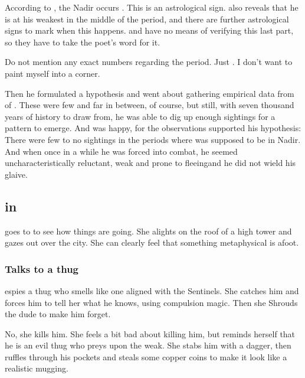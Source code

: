According to \WanderersInDarknessEmph, the Nadir occurs . 
This is an astrological sign. 
\WanderersInDarknessEmph also reveals that he is at his weakest in the middle of the period, and there are further astrological signs to mark when this happens. 
\Teshrial{} and \Lothagiel{} have no means of verifying this last part, so they have to take the poet's word for it. 

Do not mention any exact numbers regarding the period. 
Just . 
I don't want to paint myself into a corner.

Then he formulated a hypothesis and went about gathering empirical data from  of \Ishnaruchaefir. 
These were few and far in between, of course, but still, with seven thousand years of history to draw from, he was able to dig up enough sightings for a pattern to emerge. 
And \Lothagiel{} was happy, for the observations supported his hypothesis: 
There were few to no sightings in the periods where \Ishnaruchaefir{} was supposed to be in Nadir. 
And when once in a while he was forced into combat, he seemed uncharacteristically reluctant, weak and prone to fleeing\dash and he did not wield his glaive. 










\subsection[Criseis in Malcur]{\Criseis in \Malcur}
\Criseis goes to \Malcur to see how things are going. 
She alights on the roof of a high tower and gazes out over the city. 
She can clearly feel that something metaphysical is afoot. 





\subsubsection{Talks to a thug}
\Criseis{} espies a thug who smells like one aligned with the Sentinels. 
She catches him and forces him to tell her what he knows, using compulsion magic. 
Then she Shrouds the dude to make him forget. 

No, she kills him. 
She feels a bit bad about killing him, but reminds herself that he is an evil thug who preys upon the weak. 
She stabs him with a dagger, then ruffles through his pockets and steals some copper coins to make it look like a realistic mugging. 

